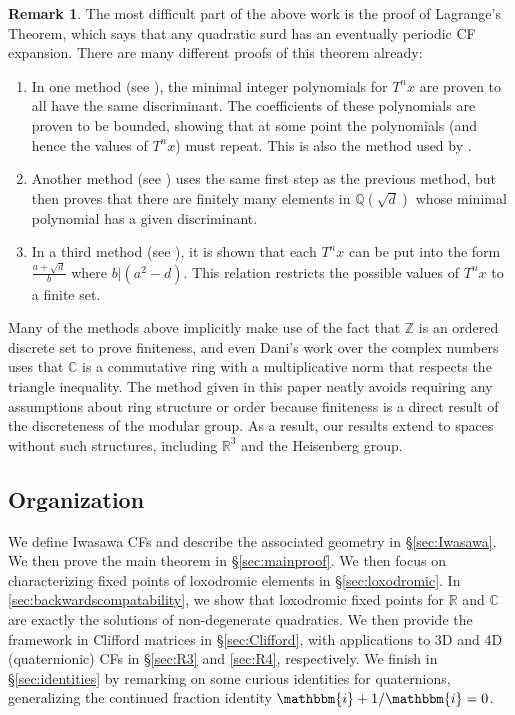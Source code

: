 \documentclass[reqno,10pt]{amsart}
\newcommand{\ii}{\mathbbm{i}}
\renewcommand{\C}{\mathbb{C}}
\newcommand{\R}{\mathbb{R}}
\newcommand{\Z}{\mathbb{Z}}
\numberwithin{thm}{section}
\theoremstyle{definition}
\theoremstyle{definition}
\newtheorem{remark}[thm]{Remark}
\numberwithin{equation}{section}
\begin{document}
\begin{remark}
\label{remark:comparison}
The most difficult part of the above work is the proof of Lagrange's Theorem, which says that any quadratic surd has an eventually periodic CF expansion. There are many different proofs of this theorem already:
\begin{enumerate}
\item In one method (see \cite{northshield2011short}), the minimal integer polynomials for $T^n x$ are proven to all have the same discriminant. The coefficients of these polynomials are proven to be bounded, showing that at some point the polynomials (and hence the values of $T^n x$) must repeat. This is also the method used by \cite{Dani2015}.
\item Another method (see \cite[Ch.~2]{borwein2014neverending}) uses the same first step as the previous method, but then proves that there are finitely many elements in $\mathbb{Q}(\sqrt{d})$ whose minimal polynomial has a given discriminant.
\item In a third method (see \cite[Thm.~1.2]{HensleyBook}), it is shown that each $T^n x$ can be put into the form $\frac{a+\sqrt{d}}{b}$ where $b|(a^2-d)$. This relation restricts the possible values of $T^n x$ to a finite set.
\end{enumerate}
Many of the methods above implicitly make use of the fact that $\Z$ is an ordered discrete set to prove finiteness, and even Dani's work over the complex numbers uses that $\C$ is a commutative ring with a multiplicative norm that respects the triangle inequality. The method given in this paper neatly avoids requiring any assumptions about ring structure or order because finiteness is a direct result of the discreteness of the modular group. As a result, our results extend to spaces without such structures, including $\R^3$ and the Heisenberg group.
\end{remark}



\subsection{Organization}
We define Iwasawa CFs and describe the associated geometry in \S  \ref{sec:Iwasawa}. We then prove the main theorem in \S \ref{sec:mainproof}. We then focus on characterizing fixed points of loxodromic elements in \S \ref{sec:loxodromic}. In \ref{sec:backwardscompatability}, we show that loxodromic fixed points for $\R$ and $\C$ are exactly the solutions of non-degenerate quadratics. We then provide the framework in Clifford matrices in \S \ref{sec:Clifford}, with applications to 3D and 4D (quaternionic) CFs in \S  \ref{sec:R3} and \ref{sec:R4}, respectively. We finish in \S \ref{sec:identities} by remarking on some curious identities for quaternions, generalizing the continued fraction identity $\ii+1/\ii=0$.
\end{document}
